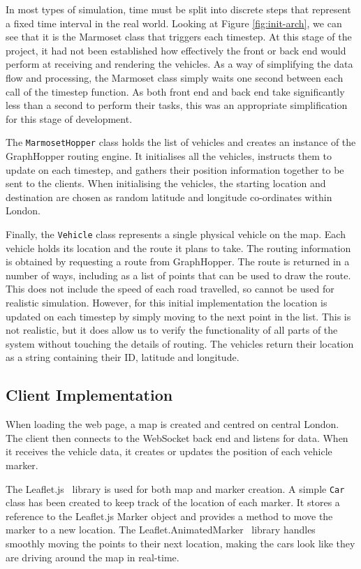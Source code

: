 \documentclass[ %
                    author={Alexander Hill},
                supervisor={Dr. Benjamin Sach},
                    degree={MEng},
                     title={MARMOSET},
                  subtitle={Multi-Agent Route Management using Online Simulation for Efficient Transportation},
                      type={research},
                      year={2016} ]{dissertation}
\begin{document}
In most types of simulation, time must be split into discrete steps that
represent a fixed time interval in the real world. Looking at Figure
\ref{fig:init-arch}, we can see that it is the Marmoset class that triggers each
timestep. At this stage of the project, it had not been established how
effectively the front or back end would perform at receiving and rendering the
vehicles. As a way of simplifying the data flow and processing, the Marmoset
class simply waits one second between each call of the timestep function.  As
both front end and back end take significantly less than a second to perform
their tasks, this was an appropriate simplification for this stage of
development.

The \texttt{MarmosetHopper} class holds the list of vehicles and creates an
instance of the GraphHopper routing engine. It initialises all the vehicles,
instructs them to update on each timestep, and gathers their position
information together to be sent to the clients. When initialising the vehicles,
the starting location and destination are chosen as random latitude and
longitude co-ordinates within London.

Finally, the \texttt{Vehicle} class represents a single physical vehicle on the
map. Each vehicle holds its location and the route it plans to take. The routing
information is obtained by requesting a route from GraphHopper. The route is
returned in a number of ways, including as a list of points that can be used to
draw the route. This does not include the speed of each road travelled, so
cannot be used for realistic simulation. However, for this initial
implementation the location is updated on each timestep by simply moving to the
next point in the list. This is not realistic, but it does allow us to verify
the functionality of all parts of the system without touching the details of
routing. The vehicles return their location as a string containing their ID,
latitude and longitude.

\subsection{Client Implementation}

When loading the web page, a map is created and centred on central London.  The
client then connects to the WebSocket back end and listens for data. When it
receives the vehicle data, it creates or updates the position of each vehicle
marker.

The Leaflet.js~\cite{leaflet} library is used for both map and marker creation.
A simple \texttt{Car} class has been created to keep track of the location of
each marker. It stores a reference to the Leaflet.js Marker object and provides
a method to move the marker to a new location. The
Leaflet.AnimatedMarker~\cite{animarker} library handles smoothly moving the
points to their next location, making the cars look like they are driving around
the map in real-time.
\end{document}
